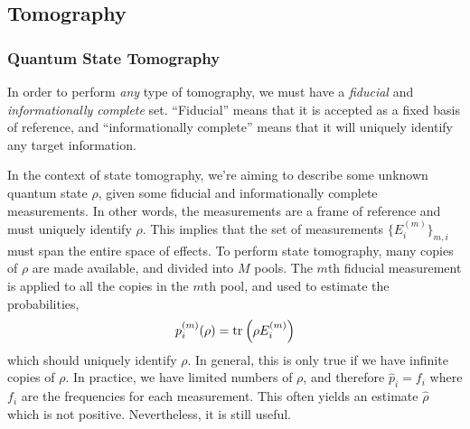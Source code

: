\subsection{Tomography}

\subsubsection{Quantum State Tomography}

In order to perform \textit{any} type of tomography, we must have a \textit{fiducial} and
\textit{informationally complete} set. ``Fiducial'' means that it is accepted as a fixed basis of
reference, and ``informationally complete'' means that it will uniquely identify any target
information. 

In the context of state tomography, we're aiming to describe some unknown quantum state $\rho$,
given some fiducial and informationally complete measurements. In other words, the measurements are
a frame of reference and must uniquely identify $\rho$. This implies that the set of measurements
$\{E_i^{(m)}\}_{m,i}$ must span the entire space of effects. To perform state tomography, many
copies of $\rho$ are made available, and divided into $M$ pools. The $m$th fiducial measurement is
applied to all the copies in the $m$th pool, and used to estimate the probabilities,
\begin{equation}
    p_i^{(m)} (\rho) = \text{tr}_{}\left(\rho E_i^{(m)}\right)
\end{equation}
which should uniquely identify $\rho$. In general, this is only true if we have infinite copies of
$\rho$. In practice, we have limited numbers of $\rho$, and therefore $\hat{p}_i = f_i$ where $f_i$
are the frequencies for each measurement. This often yields an estimate $\hat{\rho}$ which is not
positive. Nevertheless, it is still useful.

